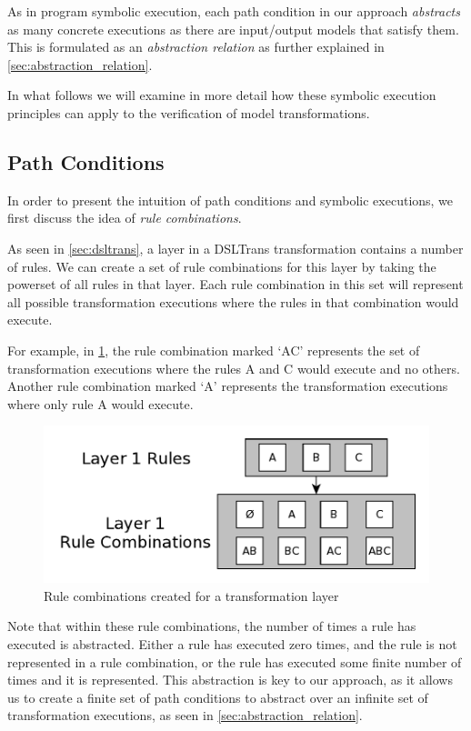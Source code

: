 As in program symbolic execution, each path condition in our approach \emph{abstracts} as many concrete executions as there are input/output models
that satisfy them. This is formulated as an \emph{abstraction relation} as further explained in \cref{sec:abstraction_relation}.

In what follows we will examine in more detail how these symbolic execution
principles can apply to the verification of model transformations.


\subsection{Path Conditions}
\label{sec:gen_path_conds}

In order to present the intuition of path conditions and symbolic executions, we
first discuss the idea of \textit{rule combinations}.

As seen in \cref{sec:dsltrans}, a layer in a DSLTrans transformation contains a
number of rules.  We can create a set of rule combinations for this layer by
taking the powerset of all rules in that layer. Each rule combination in this
set will represent all possible transformation executions where the rules in
that combination would execute.

For example, in \cref{fig:rule_combos2}, the rule combination marked `AC'
represents the set of transformation executions where the rules A and C would
execute and no others. Another rule combination marked `A' represents the
transformation executions where only rule A would execute.

\begin{figure}[h!] \centering \includegraphics[width=.40\textwidth]{./figures/overview/rule_combos.pdf}
	\caption{Rule combinations created for a transformation layer}
	\label{fig:rule_combos2}
\end{figure}

Note that within these rule combinations, the number of times a rule has
executed is abstracted. Either a rule has executed zero times, and the rule is
not represented in a rule combination, or the rule has executed some finite
number of times and it is represented. This abstraction is key to our approach,
as it allows us to create a finite set of path conditions to abstract over an
infinite set of transformation executions, as seen in
\cref{sec:abstraction_relation}.

